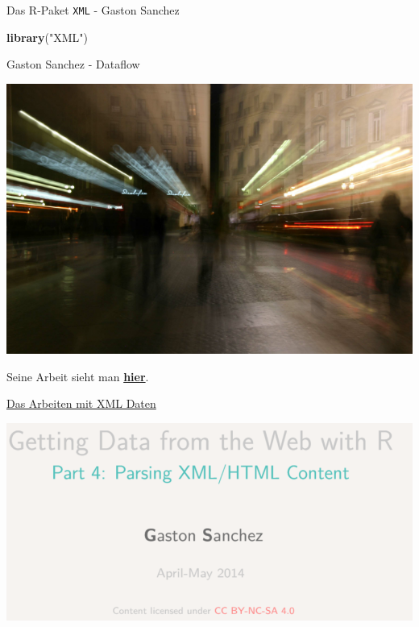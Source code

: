 \documentclass[ignorenonframetext,]{beamer}
\newenvironment{Shaded}{\begin{snugshade}}{\end{snugshade}}
\newcommand{\KeywordTok}[1]{\textcolor[rgb]{0.13,0.29,0.53}{\textbf{#1}}}
\newcommand{\StringTok}[1]{\textcolor[rgb]{0.31,0.60,0.02}{#1}}
\newcommand{\NormalTok}[1]{#1}
\begin{document}
\begin{frame}[fragile]{Das R-Paket \texttt{XML} - Gaston Sanchez}

\begin{Shaded}
\begin{Highlighting}[]
\KeywordTok{library}\NormalTok{(}\StringTok{"XML"}\NormalTok{)}
\end{Highlighting}
\end{Shaded}

\begin{block}{Gaston Sanchez - Dataflow}

\includegraphics{figure/GastonSanchez2.png}

Seine Arbeit sieht man \href{http://gastonsanchez.com/}{\textbf{hier}}.

\end{block}

\end{frame}

\begin{frame}{\href{https://github.com/gastonstat/tutorial-R-web-data/blob/master/04-parsing-xml/04-parsing-xml.pdf}{Das
Arbeiten mit XML Daten}}

\includegraphics{figure/GastonSanchez3.PNG}

\end{frame}
\end{document}
